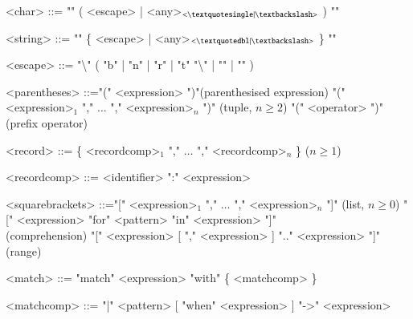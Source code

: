 \documentclass{article}
\begin{document}
\begin{grammar}
  <char> ::= "\textquotesingle" ( <escape> | <any>$_{<\textquotesingle  | \textbackslash>}$ ) "\textquotesingle"

  <string> ::= "\textquotedbl" \{ <escape> | <any>$_{<\textquotedbl | \textbackslash>}$ \} "\textquotedbl"

  <escape> ::= "\textbackslash" ( "b" | "n" | "r" | "t" "\textbackslash" | "\textquotedbl" | "\textquotesingle" )
\end{grammar}

\begin{grammar}
  <parentheses> ::="(" \textvisiblespace <expression> ")"\textvisiblespace \hfill (parenthesised expression)
  \alt "(" \textvisiblespace <expression>$_1$ "," \textvisiblespace $\ldots$ "," \textvisiblespace <expression>$_n$ ")" \textvisiblespace \hfill (tuple, $n \geq 2$)
  \alt "(" \textvisiblespace <operator> \textvisiblespace ")"\textvisiblespace \hfill (prefix operator)
\end{grammar}

\begin{grammar}
  <record> ::= \{ \textvisiblespace <recordcomp>$_1$ "," \textvisiblespace $\ldots$ "," \textvisiblespace <recordcomp>$_n$ \} \textvisiblespace \hfill ($n \geq 1$)

  <recordcomp> ::= <identifier> \textvisiblespace ":" \textvisiblespace <expression>
\end{grammar}

\begin{grammar}
  <squarebrackets> ::="[" \textvisiblespace <expression>$_1$ "," \textvisiblespace $\ldots$ "," \textvisiblespace <expression>$_n$ "]" \textvisiblespace \hfill (list, $n \geq 0$)
  \alt "[" \textvisiblespace <expression> "for" \textvisiblespace <pattern> "in" <expression> "]" \textvisiblespace
  \\ \hfill (comprehension)
  \alt "[" \textvisiblespace <expression> [ "," \textvisiblespace <expression> ] ".." \textvisiblespace <expression> "]" \textvisiblespace \hfill (range)
\end{grammar}

\begin{grammar}
  <match> ::= "match" \textvisiblespace <expression> "with" \textvisiblespace  \{ <matchcomp>  \}

  <matchcomp> ::= "|" \textvisiblespace <pattern> [ "when" \textvisiblespace <expression> ] "->" \textvisiblespace <expression>
\end{grammar}
\end{document}
